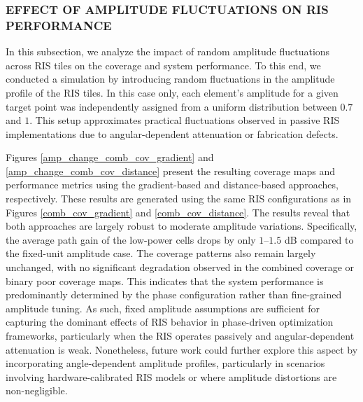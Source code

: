 \documentclass{IEEEoj}
\begin{document}
\subsubsection{EFFECT OF AMPLITUDE FLUCTUATIONS ON RIS PERFORMANCE}
In this subsection, we analyze the impact of random amplitude fluctuations across RIS tiles on the coverage and system performance. To this end, we conducted a simulation by introducing random fluctuations in the amplitude profile of the RIS tiles. In this case only, each element’s amplitude for a given target point was independently assigned from a uniform distribution between $0.7$ and $1$. This setup approximates practical fluctuations observed in passive RIS implementations due to angular-dependent attenuation or fabrication defects.

Figures \ref{amp_change_comb_cov_gradient} and \ref{amp_change_comb_cov_distance} present the resulting coverage maps and performance metrics using the gradient-based and distance-based approaches, respectively. These results are generated using the same RIS configurations as in Figures \ref{comb_cov_gradient} and \ref{comb_cov_distance}. The results reveal that both approaches are largely robust to moderate amplitude variations. Specifically, the average path gain of the low-power cells drops by only $1$–$1.5$ dB compared to the fixed-unit amplitude case. The coverage patterns also remain largely unchanged, with no significant degradation observed in the combined coverage or binary poor coverage maps. This indicates that the system performance is predominantly determined by the phase configuration rather than fine-grained amplitude tuning. As such, fixed amplitude assumptions are sufficient for capturing the dominant effects of RIS behavior in phase-driven optimization frameworks, particularly when the RIS operates passively and angular-dependent attenuation is weak. Nonetheless, future work could further explore this aspect by incorporating angle-dependent amplitude profiles, particularly in scenarios involving hardware-calibrated RIS models or where amplitude distortions are non-negligible.
\end{document}
